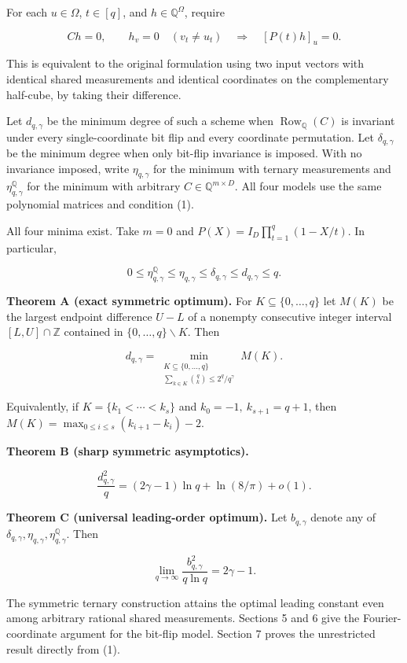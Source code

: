 \documentclass[
  10pt,
]{article}
\begin{document}
For each \(u\in\Omega\), \(t\in[q]\), and \(h\in\mathbb Q^\Omega\), require

\[
 Ch=0,\qquad h_v=0\quad(v_t\ne u_t)
 \quad\Longrightarrow\quad [P(t)h]_u=0.\tag{1}
\]

This is equivalent to the original formulation using two input vectors with identical shared measurements and identical coordinates on the complementary half-cube, by taking their difference.

Let \(d_{q,\gamma}\) be the minimum degree of such a scheme when \(\operatorname{Row}_{\mathbb Q}(C)\) is invariant under every single-coordinate bit flip and every coordinate permutation. Let \(\delta_{q,\gamma}\) be the minimum degree when only bit-flip invariance is imposed. With no invariance imposed, write \(\eta_{q,\gamma}\) for the minimum with ternary measurements and \(\eta^{\mathbb Q}_{q,\gamma}\) for the minimum with arbitrary \(C\in\mathbb Q^{m\times D}\). All four models use the same polynomial matrices and condition (1).

All four minima exist. Take \(m=0\) and \(P(X)=I_D\prod_{t=1}^q(1-X/t)\). In particular,

\[
 0\le\eta^{\mathbb Q}_{q,\gamma}\le\eta_{q,\gamma}\le\delta_{q,\gamma}\le d_{q,\gamma}\le q.
\]

\textbf{Theorem A (exact symmetric optimum).} For \(K\subseteq\{0,\ldots,q\}\) let \(M(K)\) be the largest endpoint difference \(U-L\) of a nonempty consecutive integer interval \([L,U]\cap\mathbb Z\) contained in \(\{0,\ldots,q\}\mathbin{\backslash} K\). Then

\[
 \boxed{d_{q,\gamma}=
 \min_{\substack{K\subseteq\{0,\ldots,q\}\\
 \sum_{k\in K}\binom qk\le 2^q/q^\gamma}}M(K).}\tag{2}
\]

Equivalently, if \(K=\{k_1<\cdots<k_s\}\) and \(k_0=-1,\ k_{s+1}=q+1\), then \(M(K)=\max_{0\le i\le s}(k_{i+1}-k_i)-2\).

\textbf{Theorem B (sharp symmetric asymptotics).}

\[
 \boxed{\frac{d_{q,\gamma}^2}{q}
 =(2\gamma-1)\ln q+\ln(8/\pi)+o(1).}\tag{3}
\]

\textbf{Theorem C (universal leading-order optimum).} Let \(b_{q,\gamma}\) denote any of \(\delta_{q,\gamma},\eta_{q,\gamma},\eta^{\mathbb Q}_{q,\gamma}\). Then

\[
 \boxed{\lim_{q\to\infty}\frac{b_{q,\gamma}^2}{q\ln q}=2\gamma-1.}\tag{4}
\]

The symmetric ternary construction attains the optimal leading constant even among arbitrary rational shared measurements. Sections 5 and 6 give the Fourier-coordinate argument for the bit-flip model. Section 7 proves the unrestricted result directly from (1).
\end{document}
